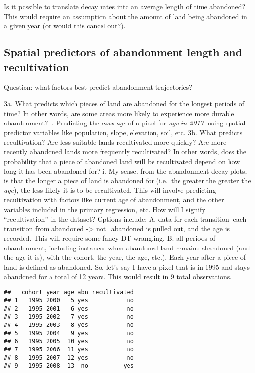 \documentclass[
]{article}
\begin{document}
Is it possible to translate decay rates into an average length of time abandoned?
This would require an assumption about the amount of land being abandoned in a given year (or would this cancel out?).

\hypertarget{spatial-predictors-of-abandonment-length-and-recultivation}{%
\subsection{Spatial predictors of abandonment length and recultivation}\label{spatial-predictors-of-abandonment-length-and-recultivation}}

Question: what factors best predict abandonment trajectories?

3a. What predicts which pieces of land are abandoned for the longest periods of time? In other words, are some areas more likely to experience more durable abandonment?
i. Predicting the \emph{max age} of a pixel {[}or \emph{age in 2017}{]} using spatial predictor variables like population, slope, elevation, soil, etc.
3b. What predicts recultivation? Are less suitable lands recultivated more quickly? Are more recently abandoned lands more frequently recultivated? In other words, does the probability that a piece of abandoned land will be recultivated depend on how long it has been abandoned for?
i. My sense, from the abandonment decay plots, is that the longer a piece of land is abandoned for (i.e.~the greater the greater the \emph{age}), the less likely it is to be recultivated. This will involve predicting recultivation with factors like current age of abandonment, and the other variables included in the primary regression, etc. How will I signify ``recultivation'' in the dataset? Options include:
A. data for each transition, each transition from abandoned -\textgreater{} not\_abandoned is pulled out, and the age is recorded. This will require some fancy DT wrangling.
B. all periods of abandonment, including instances when abandoned land remains abandoned (and the age it is), with the cohort, the year, the age, etc.). Each year after a piece of land is defined as abandoned. So, let's say I have a pixel that is in 1995 and stays abandoned for a total of 12 years. This would result in 9 total observations.

\begin{verbatim}
##   cohort year age abn recultivated
## 1   1995 2000   5 yes           no
## 2   1995 2001   6 yes           no
## 3   1995 2002   7 yes           no
## 4   1995 2003   8 yes           no
## 5   1995 2004   9 yes           no
## 6   1995 2005  10 yes           no
## 7   1995 2006  11 yes           no
## 8   1995 2007  12 yes           no
## 9   1995 2008  13  no          yes
\end{verbatim}
\end{document}
